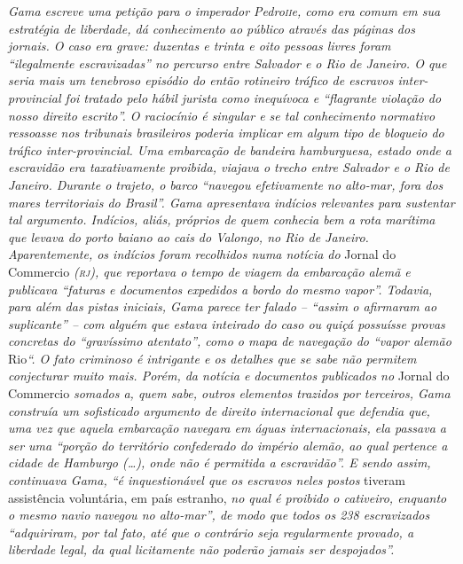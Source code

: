\begin{didascalia}
\emph{Gama escreve uma petição para o imperador Pedro\textsc{ii}e, como era
comum em sua estratégia de liberdade, dá conhecimento ao público através
das páginas dos jornais. O caso era grave: duzentas e trinta e oito
pessoas livres foram ``ilegalmente escravizadas'' no percurso entre
Salvador e o Rio de Janeiro. O que seria mais um tenebroso episódio do
então rotineiro tráfico de escravos inter-provincial foi tratado pelo
hábil jurista como inequívoca e ``flagrante violação do nosso direito
escrito''. O raciocínio é singular e se tal conhecimento normativo
ressoasse nos tribunais brasileiros poderia implicar em algum tipo de
bloqueio do tráfico inter-provincial. Uma embarcação de bandeira
hamburguesa, estado onde a escravidão era taxativamente proibida,
viajava o trecho entre Salvador e o Rio de Janeiro. Durante o trajeto, o
barco ``navegou efetivamente no alto-mar, fora dos mares territoriais do
Brasil''. Gama apresentava indícios relevantes para sustentar tal
argumento. Indícios, aliás, próprios de quem conhecia bem a rota
marítima que levava do porto baiano ao cais do Valongo, no Rio de
Janeiro. Aparentemente, os indícios foram recolhidos numa notícia do}
Jornal do Commercio \emph{(\textsc{rj}), que reportava o tempo de viagem da
embarcação alemã e publicava ``faturas e documentos expedidos a bordo do
mesmo vapor''. Todavia, para além das pistas iniciais, Gama parece ter
falado -- ``assim o afirmaram ao suplicante'' -- com alguém que estava
inteirado do caso ou quiçá possuísse provas concretas do ``gravíssimo
atentato'', como o mapa de navegação do ``vapor alemão} Rio\emph{``. O fato
criminoso é intrigante e os detalhes que se sabe não permitem
conjecturar muito mais. Porém, da notícia e documentos publicados no}
Jornal do Commercio \emph{somados a, quem sabe, outros elementos
trazidos por terceiros, Gama construía um sofisticado argumento de
direito internacional que defendia que, uma vez que aquela embarcação
navegara em águas internacionais, ela passava a ser uma ``porção do
território confederado do império alemão, ao qual pertence a cidade de
Hamburgo (\ldots{}), onde não é permitida a escravidão''. E sendo assim,
continuava Gama, ``é inquestionável que os escravos neles postos} tiveram
assistência voluntária, em país estranho, \emph{no qual é proibido o
cativeiro, enquanto o mesmo navio navegou no alto-mar'', de modo que
todos os 238 escravizados ``adquiriram, por tal fato, até que o contrário
seja regularmente provado, a liberdade legal, da qual licitamente não
poderão jamais ser despojados''.}
\end{didascalia}

